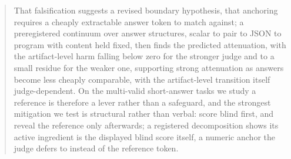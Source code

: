 \documentclass[11pt]{article}
\begin{document}
\begin{abstract}
That falsification suggests a revised boundary hypothesis, that anchoring requires a cheaply extractable answer token to match against; a preregistered continuum over answer structures, scalar to pair to JSON to program with content held fixed, then finds the predicted attenuation, with the artifact-level harm falling below zero for the stronger judge and to a small residue for the weaker one, supporting strong attenuation as answers become less cheaply comparable, with the artifact-level transition itself judge-dependent.
On the multi-valid short-answer tasks we study a reference is therefore a lever rather than a safeguard, and the strongest mitigation we test is structural rather than verbal: score blind first, and reveal the reference only afterwards; a registered decomposition shows its active ingredient is the displayed blind score itself, a numeric anchor the judge defers to instead of the reference token.
\end{abstract}
\end{document}
